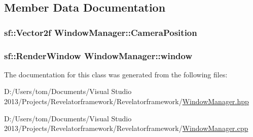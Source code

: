 \subsection{Member Data Documentation}
\hypertarget{class_window_manager_a459ad4d059f5c4f286c24af4550c6101}{
\subsubsection[{Camera\-Position}]{\setlength{\rightskip}{0pt plus 5cm}sf\-::\-Vector2f Window\-Manager\-::\-Camera\-Position\hspace{0.3cm}{\ttfamily [private]}}}\label{class_window_manager_a459ad4d059f5c4f286c24af4550c6101}
\hypertarget{class_window_manager_a61d47c11da0af06b979ec784a21349ea}{
\subsubsection[{window}]{\setlength{\rightskip}{0pt plus 5cm}sf\-::\-Render\-Window Window\-Manager\-::window\hspace{0.3cm}{\ttfamily [private]}}}\label{class_window_manager_a61d47c11da0af06b979ec784a21349ea}


The documentation for this class was generated from the following files\-:\begin{DoxyCompactItemize}
\item 
D\-:/\-Users/tom/\-Documents/\-Visual Studio 2013/\-Projects/\-Revelatorframework/\-Revelatorframework/\hyperlink{_window_manager_8hpp}{Window\-Manager.\-hpp}\item 
D\-:/\-Users/tom/\-Documents/\-Visual Studio 2013/\-Projects/\-Revelatorframework/\-Revelatorframework/\hyperlink{_window_manager_8cpp}{Window\-Manager.\-cpp}\end{DoxyCompactItemize}
